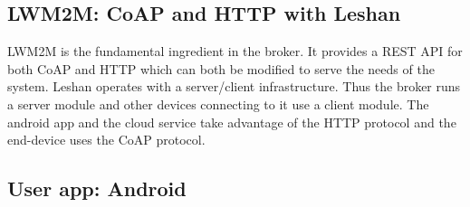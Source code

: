 \subsection{LWM2M: CoAP and HTTP with Leshan}


LWM2M is the fundamental ingredient in the broker. It provides a REST API for both CoAP and HTTP which can both be modified to serve the needs of the system. Leshan operates with a server/client infrastructure. Thus the broker runs a server module and other devices connecting to it use a client module. The android app and the cloud service take advantage of the HTTP protocol and the end-device uses the CoAP protocol.


\subsection{User app: Android}